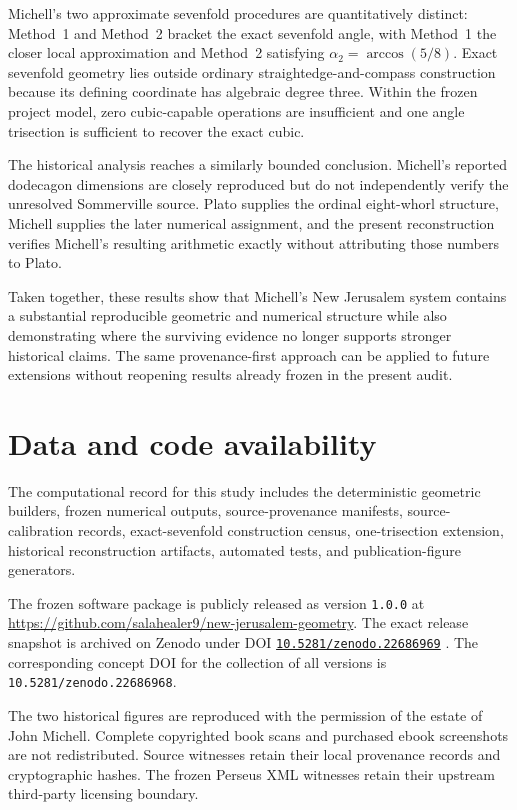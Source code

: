 \documentclass[11pt]{article}
\begin{document}
Michell's two approximate sevenfold procedures are quantitatively distinct:
Method~1 and Method~2 bracket the exact sevenfold angle, with Method~1 the
closer local approximation and Method~2 satisfying
$\alpha_2=\arccos(5/8)$.  Exact sevenfold geometry lies outside ordinary
straightedge-and-compass construction because its defining coordinate has
algebraic degree three.  Within the frozen project model, zero cubic-capable
operations are insufficient and one angle trisection is sufficient to recover
the exact cubic.

The historical analysis reaches a similarly bounded conclusion.  Michell's
reported dodecagon dimensions are closely reproduced but do not independently
verify the unresolved Sommerville source.  Plato supplies the ordinal
eight-whorl structure, Michell supplies the later numerical assignment, and
the present reconstruction verifies Michell's resulting arithmetic exactly
without attributing those numbers to Plato.

Taken together, these results show that Michell's New Jerusalem system contains
a substantial reproducible geometric and numerical structure while also
demonstrating where the surviving evidence no longer supports stronger
historical claims.  The same provenance-first approach can be applied to
future extensions without reopening results already frozen in the present
audit.

\section*{Data and code availability}

The computational record for this study includes the deterministic geometric
builders, frozen numerical outputs, source-provenance manifests,
source-calibration records, exact-sevenfold construction census,
one-trisection extension, historical reconstruction artifacts, automated
tests, and publication-figure generators.

The frozen software package is publicly released as version
\texttt{1.0.0} at \url{https://github.com/salahealer9/new-jerusalem-geometry}.  The exact release snapshot is
archived on Zenodo under DOI
\href{https://doi.org/10.5281/zenodo.22686969}{\texttt{10.5281/zenodo.22686969}}
\citep{gherbi2026newjerusalemgeometry}.  The corresponding concept DOI for
the collection of all versions is \texttt{10.5281/zenodo.22686968}.

The two historical figures are reproduced with the permission of the
estate of John Michell. Complete copyrighted book scans and purchased ebook
screenshots are not redistributed. Source witnesses retain their local
provenance records and cryptographic hashes.  The frozen Perseus XML witnesses
retain their upstream third-party licensing boundary.
\end{document}
